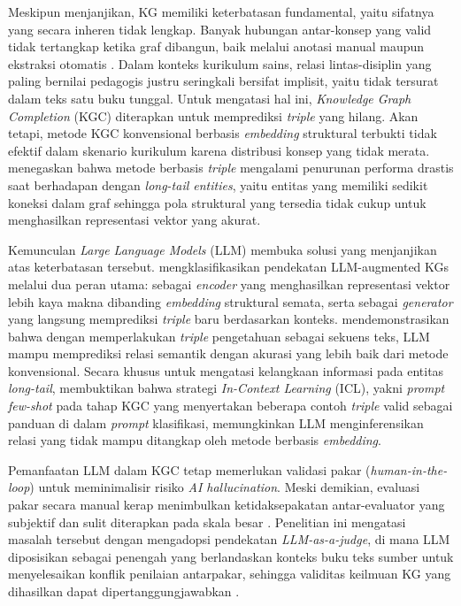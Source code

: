\documentclass[main]{subfiles}
\begin{document}
Meskipun menjanjikan, KG memiliki keterbatasan fundamental, yaitu sifatnya yang
secara inheren tidak lengkap. Banyak hubungan antar-konsep yang valid tidak
tertangkap ketika graf dibangun, baik melalui anotasi manual maupun ekstraksi
otomatis \parencite{ji_survey_2022}. Dalam konteks kurikulum sains, relasi lintas-disiplin
yang paling bernilai pedagogis justru seringkali bersifat implisit, yaitu tidak
tersurat dalam teks satu buku tunggal. Untuk mengatasi hal ini,
\textit{Knowledge Graph Completion} (KGC) diterapkan untuk memprediksi
\textit{triple} yang hilang. Akan tetapi, metode KGC konvensional berbasis
\textit{embedding} struktural terbukti tidak efektif dalam skenario kurikulum
karena distribusi konsep yang tidak merata. \textcite{wei_kicgpt_2023} menegaskan bahwa
metode berbasis \textit{triple} mengalami penurunan performa drastis saat
berhadapan dengan \textit{long-tail entities}, yaitu entitas yang memiliki sedikit
koneksi dalam graf sehingga pola struktural yang tersedia tidak cukup untuk
menghasilkan representasi vektor yang akurat.

Kemunculan \textit{Large Language Models} (LLM) membuka solusi yang menjanjikan
atas keterbatasan tersebut. \textcite{pan_unifying_2024} mengklasifikasikan pendekatan
LLM-augmented KGs melalui dua peran utama: sebagai \textit{encoder} yang
menghasilkan representasi vektor lebih kaya makna dibanding \textit{embedding}
struktural semata, serta sebagai \textit{generator} yang langsung memprediksi
\textit{triple} baru berdasarkan konteks. \textcite{yao_exploring_2025} mendemonstrasikan
bahwa dengan memperlakukan \textit{triple} pengetahuan sebagai sekuens teks,
LLM mampu memprediksi relasi semantik dengan akurasi yang lebih baik dari metode
konvensional. Secara khusus untuk mengatasi kelangkaan informasi pada entitas
\textit{long-tail}, \textcite{wei_kicgpt_2023} membuktikan bahwa strategi
\textit{In-Context Learning} (ICL), yakni \textit{prompt few-shot} pada tahap KGC
yang menyertakan beberapa contoh \textit{triple} valid sebagai panduan di dalam
\textit{prompt} klasifikasi, memungkinkan LLM menginferensikan
relasi yang tidak mampu ditangkap oleh metode berbasis \textit{embedding}.

Pemanfaatan LLM dalam KGC tetap memerlukan validasi pakar
(\textit{human-in-the-loop}) untuk meminimalisir risiko \textit{AI hallucination}.
Meski demikian, evaluasi pakar secara manual kerap menimbulkan ketidaksepakatan
antar-evaluator yang subjektif dan sulit diterapkan pada skala besar
\parencite{gu_survey_nodate}. Penelitian ini mengatasi masalah tersebut dengan
mengadopsi pendekatan \textit{LLM-as-a-judge}, di mana LLM diposisikan sebagai
penengah yang berlandaskan konteks buku teks sumber untuk menyelesaikan konflik
penilaian antarpakar, sehingga validitas keilmuan KG yang dihasilkan dapat
dipertanggungjawabkan \parencite{gu_survey_nodate}.
\end{document}
